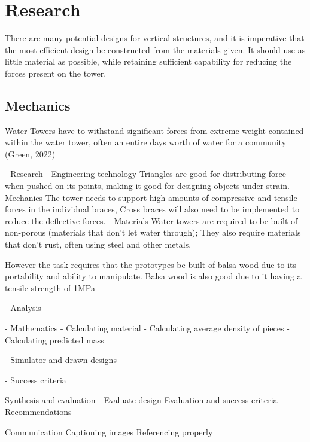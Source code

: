 \documentclass[12pt,landscape]{article}
\begin{document}
\section{Research}

There are many potential designs for vertical structures, and it is imperative that the most efficient design be constructed from the materials given. It should use as little material as possible, while retaining sufficient capability for reducing the forces present on the tower. 

\subsection{Mechanics}
Water Towers have to withstand significant forces from extreme weight contained within the water tower, often an entire days worth of water for a community (Green, 2022) 


- Research
- Engineering technology 
Triangles are good for distributing force when pushed on its points, making it good for designing objects under strain.
- Mechanics 
The tower needs to support high amounts of compressive and tensile forces in the individual braces, Cross braces will also need to be implemented to reduce the deflective forces.
- Materials
Water towers are required to be built of non-porous (materials that don’t let water through); They also require materials that don’t rust, often using steel and other metals.

However the task requires that the prototypes be built of balsa wood due to its portability and ability to manipulate. 
Balsa wood is also good due to it having a tensile strength of 1MPa



- Analysis

- Mathematics
- Calculating material
- Calculating average density of pieces
- Calculating predicted mass

- Simulator and drawn designs

- Success criteria

Synthesis and evaluation 
- Evaluate design
Evaluation and success criteria
Recommendations

Communication 
Captioning images
Referencing properly



\end{document}
